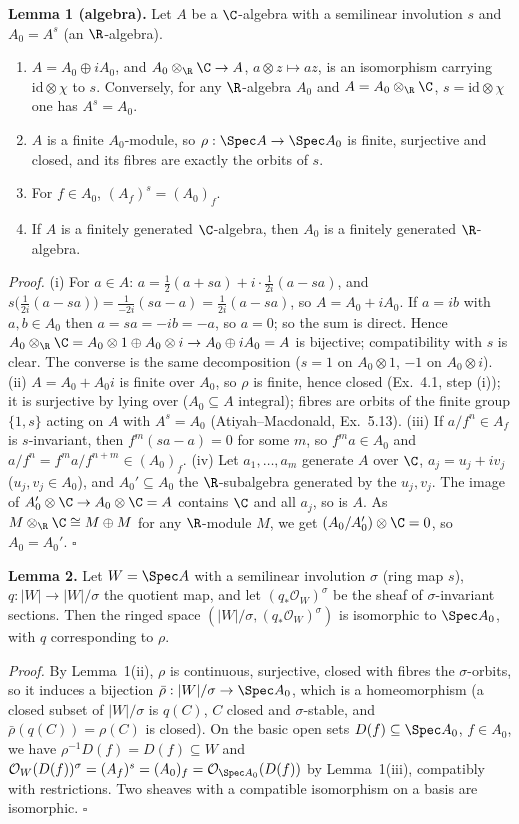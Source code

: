\documentclass[11pt]{article}
\begin{document}
\textbf{Lemma 1 (algebra).} Let $A$ be a $\C$-algebra with a semilinear involution $s$ and $A_0=A^s$ (an $\R$-algebra).
\begin{enumerate}[label=(\roman*),leftmargin=*]
\item $A=A_0\oplus iA_0$, and $A_0\otimes_{\R}\C\to A$, $a\otimes z\mapsto az$, is an isomorphism carrying $\mathrm{id}\otimes\chi$ to $s$. Conversely, for any $\R$-algebra $A_0$ and $A=A_0\otimes_{\R}\C$, $s=\mathrm{id}\otimes\chi$ one has $A^s=A_0$.
\item $A$ is a finite $A_0$-module, so $\rho:\Spec A\to\Spec A_0$ is finite, surjective and closed, and its fibres are exactly the orbits of $s$.
\item For $f\in A_0$, $(A_f)^s=(A_0)_f$.
\item If $A$ is a finitely generated $\C$-algebra, then $A_0$ is a finitely generated $\R$-algebra.
\end{enumerate}
\emph{Proof.} (i) For $a\in A$: $a=\tfrac12(a+sa)+i\cdot\tfrac1{2i}(a-sa)$, and $s\bigl(\tfrac1{2i}(a-sa)\bigr)=\tfrac1{-2i}(sa-a)=\tfrac1{2i}(a-sa)$, so $A=A_0+iA_0$. If $a=ib$ with $a,b\in A_0$ then $a=sa=-ib=-a$, so $a=0$; so the sum is direct. Hence $A_0\otimes_{\R}\C=A_0\otimes1\oplus A_0\otimes i\to A_0\oplus iA_0=A$ is bijective; compatibility with $s$ is clear. The converse is the same decomposition ($s=1$ on $A_0\otimes1$, $-1$ on $A_0\otimes i$). (ii) $A=A_0+A_0i$ is finite over $A_0$, so $\rho$ is finite, hence closed (Ex.~4.1, step (i)); it is surjective by lying over ($A_0\subseteq A$ integral); fibres are orbits of the finite group $\{1,s\}$ acting on $A$ with $A^{s}=A_0$ (Atiyah--Macdonald, Ex.~5.13). (iii) If $a/f^n\in A_f$ is $s$-invariant, then $f^m(sa-a)=0$ for some $m$, so $f^ma\in A_0$ and $a/f^n=f^ma/f^{n+m}\in(A_0)_f$. (iv) Let $a_1,\dots,a_m$ generate $A$ over $\C$, $a_j=u_j+iv_j$ ($u_j,v_j\in A_0$), and $A_0'\subseteq A_0$ the $\R$-subalgebra generated by the $u_j,v_j$. The image of $A_0'\otimes\C\to A_0\otimes\C=A$ contains $\C$ and all $a_j$, so is $A$. As $M\otimes_{\R}\C\cong M\oplus M$ for any $\R$-module $M$, we get $(A_0/A_0')\otimes\C=0$, so $A_0=A_0'$. $\square$

\textbf{Lemma 2.} Let $W=\Spec A$ with a semilinear involution $\sigma$ (ring map $s$), $q:|W|\to|W|/\sigma$ the quotient map, and let $(q_*\mathcal O_W)^\sigma$ be the sheaf of $\sigma$-invariant sections. Then the ringed space $(|W|/\sigma,(q_*\mathcal O_W)^\sigma)$ is isomorphic to $\Spec A_0$, with $q$ corresponding to $\rho$.

\emph{Proof.} By Lemma~1(ii), $\rho$ is continuous, surjective, closed with fibres the $\sigma$-orbits, so it induces a bijection $\bar\rho:|W|/\sigma\to\Spec A_0$, which is a homeomorphism (a closed subset of $|W|/\sigma$ is $q(C)$, $C$ closed and $\sigma$-stable, and $\bar\rho(q(C))=\rho(C)$ is closed). On the basic open sets $D(f)\subseteq\Spec A_0$, $f\in A_0$, we have $\rho^{-1}D(f)=D(f)\subseteq W$ and $\mathcal O_W(D(f))^\sigma=(A_f)^s=(A_0)_f=\mathcal O_{\Spec A_0}(D(f))$ by Lemma~1(iii), compatibly with restrictions. Two sheaves with a compatible isomorphism on a basis are isomorphic. $\square$
\end{document}
